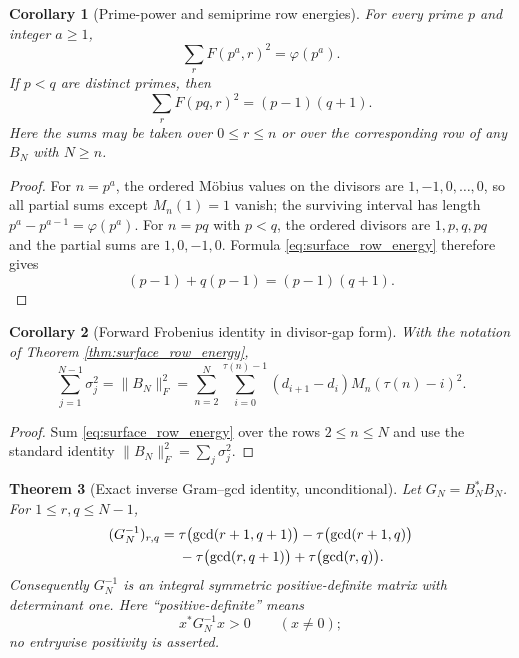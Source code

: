 \documentclass[11pt]{amsart}
\numberwithin{equation}{section}
\theoremstyle{plain}
\newtheorem{theorem}{Theorem}[section]
\newtheorem{corollary}[theorem]{Corollary}
\theoremstyle{definition}
\theoremstyle{remark}
\newcommand{\Fsurf}{F}
\begin{document}
\begin{corollary}[Prime-power and semiprime row energies]
\label{cor:row_energy_special_cases}
For every prime $p$ and integer $a\ge1$,
\begin{equation}
\sum_r\Fsurf(p^a,r)^2=\varphi(p^a).
\label{eq:prime_power_row_energy}
\end{equation}
If $p<q$ are distinct primes, then
\begin{equation}
\sum_r\Fsurf(pq,r)^2=(p-1)(q+1).
\label{eq:semiprime_row_energy}
\end{equation}
Here the sums may be taken over $0\le r\le n$ or over the corresponding row of any $B_N$ with $N\ge n$.
\end{corollary}

\begin{proof}
For $n=p^a$, the ordered Möbius values on the divisors are $1,-1,0,\ldots,0$, so all partial sums except $M_n(1)=1$ vanish; the surviving interval has length $p^a-p^{a-1}=\varphi(p^a)$.  For $n=pq$ with $p<q$, the ordered divisors are $1,p,q,pq$ and the partial sums are $1,0,-1,0$.  Formula \eqref{eq:surface_row_energy} therefore gives
\begin{equation}
(p-1)+q(p-1)=(p-1)(q+1).
\end{equation}
\end{proof}

\begin{corollary}[Forward Frobenius identity in divisor-gap form]
\label{cor:forward_frobenius}
With the notation of Theorem \ref{thm:surface_row_energy},
\begin{equation}
\sum_{j=1}^{N-1}\sigma_j^2
=\|B_N\|_F^2
=\sum_{n=2}^{N}\sum_{i=0}^{\tau(n)-1}
(d_{i+1}-d_i)M_n(\tau(n)-i)^2.
\label{eq:forward_frobenius_gap}
\end{equation}
\end{corollary}

\begin{proof}
Sum \eqref{eq:surface_row_energy} over the rows $2\le n\le N$ and use the standard identity $\|B_N\|_F^2=\sum_j\sigma_j^2$.
\end{proof}

\begin{theorem}[Exact inverse Gram--gcd identity, unconditional]
\label{thm:inverse_gram_gcd}
Let $G_N=B_N^*B_N$.  For $1\le r,q\le N-1$,
\begin{align}
(G_N^{-1})_{r,q}
={}&\tau\bigl(\gcd(r+1,q+1)\bigr)
-\tau\bigl(\gcd(r+1,q)\bigr) \notag\\
&-\tau\bigl(\gcd(r,q+1)\bigr)
+\tau\bigl(\gcd(r,q)\bigr).
\label{eq:inverse_gram_gcd}
\end{align}
Consequently $G_N^{-1}$ is an integral symmetric positive-definite matrix with determinant one.  Here ``positive-definite'' means
\begin{equation}
x^*G_N^{-1}x>0\qquad(x\ne0);
\label{eq:inverse_gram_positive_definite}
\end{equation}
no entrywise positivity is asserted.
\end{theorem}
\end{document}

